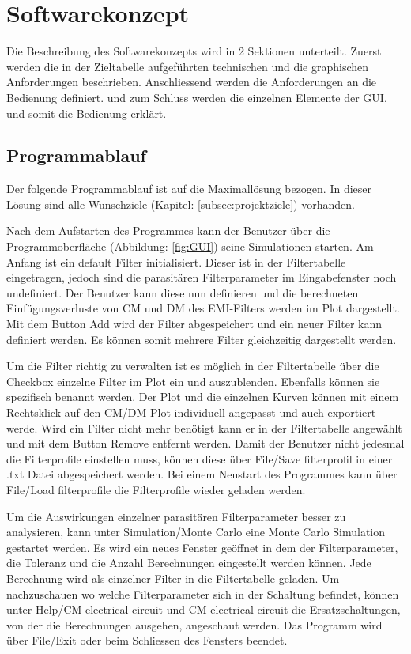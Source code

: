 \section{Softwarekonzept} \label{sec:softwarekonzept}

Die Beschreibung des Softwarekonzepts wird in 2 Sektionen unterteilt. Zuerst werden die in der Zieltabelle aufgeführten technischen und die graphischen Anforderungen beschrieben.  Anschliessend werden die Anforderungen an die Bedienung definiert. und zum Schluss werden die einzelnen Elemente der GUI, und somit die Bedienung erklärt.

\subsection{Programmablauf} \label{subsec:programmablauf}

Der folgende Programmablauf ist auf die Maximallösung bezogen. In dieser Lösung sind alle Wunschziele (Kapitel: \ref{subsec:projektziele}) vorhanden.

Nach dem Aufstarten des Programmes kann der Benutzer über die Programmoberfläche (Abbildung: \ref{fig:GUI}) seine Simulationen starten.
Am Anfang ist ein default Filter initialisiert. Dieser ist in der Filtertabelle eingetragen, jedoch sind die parasitären Filterparameter im Eingabefenster noch undefiniert. Der Benutzer kann diese nun definieren und die berechneten Einfügungsverluste von CM und DM des EMI-Filters werden im Plot dargestellt. Mit dem Button Add wird der Filter abgespeichert und ein neuer Filter kann definiert werden. Es können somit mehrere Filter gleichzeitig dargestellt werden. 

Um die Filter richtig zu verwalten ist es möglich in der Filtertabelle über die Checkbox einzelne Filter im Plot ein und auszublenden. Ebenfalls können sie spezifisch benannt werden. Der Plot und die einzelnen Kurven können mit einem Rechtsklick auf den CM/DM Plot individuell angepasst und auch exportiert werde. Wird ein Filter nicht mehr benötigt kann er in der Filtertabelle angewählt und mit dem Button Remove entfernt werden. Damit der Benutzer nicht jedesmal die Filterprofile einstellen muss, können diese über File/Save filterprofil in einer .txt Datei abgespeichert werden. Bei einem Neustart des Programmes kann über File/Load filterprofile die Filterprofile wieder geladen werden. 

Um die Auswirkungen einzelner parasitären Filterparameter besser zu analysieren, kann unter Simulation/Monte Carlo eine Monte Carlo Simulation gestartet werden. Es wird ein neues Fenster geöffnet in dem der Filterparameter, die Toleranz und die Anzahl Berechnungen eingestellt werden können. Jede Berechnung wird als einzelner Filter in die Filtertabelle geladen. Um nachzuschauen wo welche Filterparameter sich in der Schaltung befindet, können unter Help/CM electrical circuit und CM electrical circuit die Ersatzschaltungen, von der die Berechnungen ausgehen, angeschaut werden. Das Programm wird über File/Exit oder beim Schliessen des Fensters beendet.

